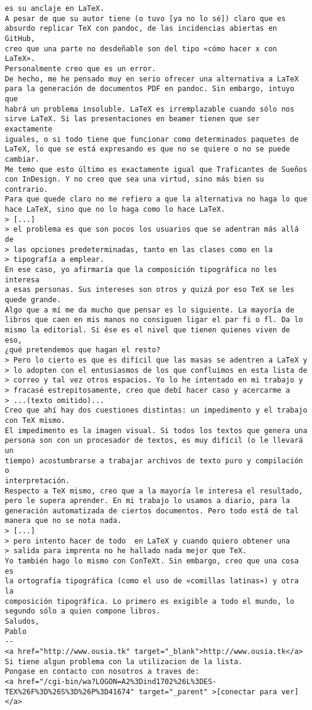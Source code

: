 \documentclass[a4paper,10pt]{article}
\begin{document}
\begin{lstlisting}
es su anclaje en LaTeX.
A pesar de que su autor tiene (o tuvo [ya no lo sé]) claro que es
absurdo replicar TeX con pandoc, de las incidencias abiertas en GitHub,
creo que una parte no desdeñable son del tipo «cómo hacer x con LaTeX».
Personalmente creo que es un error.
De hecho, me he pensado muy en serio ofrecer una alternativa a LaTeX
para la generación de documentos PDF en pandoc. Sin embargo, intuyo que
habrá un problema insoluble. LaTeX es irremplazable cuando sólo nos
sirve LaTeX. Si las presentaciones en beamer tienen que ser exactamente
iguales, o si todo tiene que funcionar como determinados paquetes de
LaTeX, lo que se está expresando es que no se quiere o no se puede cambiar.
Me temo que esto último es exactamente igual que Traficantes de Sueños
con InDesign. Y no creo que sea una virtud, sino más bien su contrario.
Para que quede claro no me refiero a que la alternativa no haga lo que
hace LaTeX, sino que no lo haga como lo hace LaTeX.
> [...]
> el problema es que son pocos los usuarios que se adentran más allá de
> las opciones predeterminadas, tanto en las clases como en la
> tipografía a emplear.
En ese caso, yo afirmaría que la composición tipográfica no les interesa
a esas personas. Sus intereses son otros y quizá por eso TeX se les
quede grande.
Algo que a mí me da mucho que pensar es lo siguiente. La mayoría de
libros que caen en mis manos no consiguen ligar el par fi o fl. Da lo
mismo la editorial. Si ése es el nivel que tienen quienes viven de eso,
¿qué pretendemos que hagan el resto?
> Pero lo cierto es que es difícil que las masas se adentren a LaTeX y
> lo adopten con el entusiasmos de los que confluimos en esta lista de
> correo y tal vez otros espacios. Yo lo he intentado en mi trabajo y
> fracasé estrepitosamente, creo que debí hacer caso y acercarme a
> ...(texto omitido)...
Creo que ahí hay dos cuestiones distintas: un impedimento y el trabajo
con TeX mismo.
El impedimento es la imagen visual. Si todos los textos que genera una
persona son con un procesador de textos, es muy difícil (o le llevará un
tiempo) acostumbrarse a trabajar archivos de texto puro y compilación o
interpretación.
Respecto a TeX mismo, creo que a la mayoría le interesa el resultado,
pero le supera aprender. En mi trabajo lo usamos a diario, para la
generación automatizada de ciertos documentos. Pero todo está de tal
manera que no se nota nada.
> [...]
> pero intento hacer de todo  en LaTeX y cuando quiero obtener una
> salida para imprenta no he hallado nada mejor que TeX.
Yo también hago lo mismo con ConTeXt. Sin embargo, creo que una cosa es
la ortografía tipográfica (como el uso de «comillas latinas») y otra la
composición tipográfica. Lo primero es exigible a todo el mundo, lo
segundo sólo a quien compone libros.
Saludos,
Pablo
-- 
<a href="http://www.ousia.tk" target="_blank">http://www.ousia.tk</a>
Si tiene algun problema con la utilizacion de la lista.
Pongase en contacto con nosotros a traves de:
<a href="/cgi-bin/wa?LOGON=A2%3Dind1702%26L%3DES-TEX%26F%3D%26S%3D%26P%3D41674" target="_parent" >[conectar para ver]</a>

\end{lstlisting}
\end{document}
